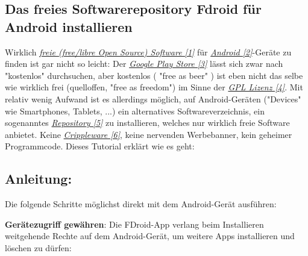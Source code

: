 \subsection*{Das freies Softwarerepository Fdroid für Android installieren}

Wirklich \href{http://de.wikipedia.org/wiki/Freie_Software}{\textit{freie (free/libre Open Source) Software [1]}} für \href{http://www.android.com/}{\textit{Android [2]}}-Geräte zu finden ist gar nicht so leicht: Der \href{https://play.google.com/store}{\textit{Google Play Store [3]}} lässt sich zwar nach "kostenlos" durchsuchen, aber kostenlos ( "free as beer" ) ist eben nicht das selbe wie wirklich frei (quelloffen, "free as freedom") im Sinne der \href{http://de.wikipedia.org/wiki/GNU_General_Public_License}{\textit{GPL Lizenz [4]}}. Mit relativ wenig Aufwand ist es allerdings möglich, auf Android-Geräten ("Devices" wie Smartphones, Tablets, ...) ein alternatives Softwareverzeichnis, ein sogenanntes \href{http://de.wikipedia.org/wiki/Repository}{\textit{Repository [5]}} zu installieren, welches nur wirklich freie Software anbietet. Keine \href{http://de.wikipedia.org/wiki/Crippleware}{\textit{Crippleware [6]}}, keine nervenden Werbebanner, kein geheimer Programmcode. Dieses Tutorial erklärt wie es geht:


\subsection*{Anleitung:}
Die folgende Schritte möglichst direkt mit dem Android-Gerät ausführen:

\textbf{Gerätezugriff gewähren}: Die FDroid-App verlang beim Installieren weitgehende Rechte auf dem Android-Gerät, um weitere Apps installieren und löschen zu dürfen:

